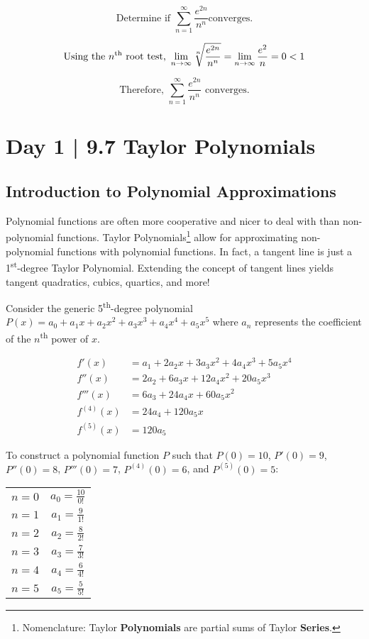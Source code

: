 \documentclass[10pt]{article}
\theoremstyle{definition}
\begin{document}
\[\text{Determine if }\sum_{n=1}^{\infty} \frac{e^{2n}}{n^n}\text{converges.}\]


\[\text{Using the $n$\textsuperscript{th} root test, }\lim_{n \to \infty} \sqrt[n]{\frac{e^{2n}}{n^n}} = \lim_{n \to \infty} \frac{e^2}{n} = 0 < 1\]

\[\text{Therefore, }\sum_{n=1}^{\infty} \frac{e^{2n}}{n^n} \text{ converges.}\]

\newpage

\section{Day 1 | 9.7 Taylor Polynomials}
\subsection{Introduction to Polynomial Approximations}
Polynomial functions are often more cooperative and nicer to deal with than non-polynomial functions. Taylor Polynomials\footnote{Nomenclature: Taylor \textbf{Polynomials} are partial sums of Taylor \textbf{Series}.} allow for approximating non-polynomial functions with polynomial functions. In fact, a tangent line is just a 1\textsuperscript{st}-degree Taylor Polynomial. Extending the concept of tangent lines yields tangent quadratics, cubics, quartics, and more!

\vspace{0.5cm}

Consider the generic 5\textsuperscript{th}-degree polynomial $P(x)=a_0 + a_1x + a_2x^2 + a_3x^3 + a_4x^4 + a_5x^5$ where $a_n$ represents the coefficient of the $n$\textsuperscript{th} power of $x$.

\begin{equation*}
\begin{split}
    f'(x)&= a_1 + 2a_2x + 3a_3x^2 + 4a_4x^3 + 5a_5x^4\\
    f''(x)&=2a_2 + 6a_3x + 12a_4x^2 + 20a_5x^3\\
    f'''(x)&=6a_3 + 24a_4x + 60a_5x^2\\
    f^{(4)}(x)&=24a_4 + 120a_5x\\
    f^{(5)}(x)&=120a_5
\end{split}
\end{equation*}

\vspace{0.5cm}
To construct a polynomial function $P$ such that $P(0)=10$, $P'(0)=9$, $P''(0)=8$, $P'''(0)=7$, $P^{(4)}(0)=6$, and $P^{(5)}(0)=5$:

\begin{center}
\begin{tabular}{c c}
$n=0$    &$a_0=\frac{10}{0!}$ \\
$n=1$    &$a_1=\frac{9}{1!}$ \\
$n=2$    &$a_2=\frac{8}{2!}$ \\
$n=3$    &$a_3=\frac{7}{3!}$ \\
$n=4$    &$a_4=\frac{6}{4!}$ \\
$n=5$    &$a_5=\frac{5}{5!}$ \\
\end{tabular}
\end{center}
\end{document}
